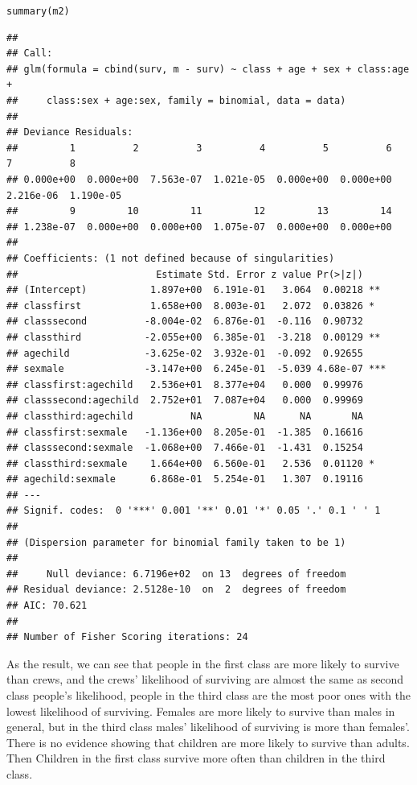 \documentclass[12pt,oneside,a4paper]{article}\usepackage[]{graphicx}\usepackage[]{xcolor}
\makeatletter
\newcommand{\hlstd}[1]{\textcolor[rgb]{0,0,0}{#1}}%
\newcommand{\hlkwd}[1]{\textcolor[rgb]{0,0,0}{#1}}%
\newenvironment{kframe}{%
 \def\at@end@of@kframe{}%
 \ifinner\ifhmode%
  \def\at@end@of@kframe{\end{minipage}}%
  \begin{minipage}{\columnwidth}%
 \fi\fi%
 \def\FrameCommand##1{\hskip\@totalleftmargin \hskip-\fboxsep
 \colorbox{shadecolor}{##1}\hskip-\fboxsep
     \hskip-\linewidth \hskip-\@totalleftmargin \hskip\columnwidth}%
 \MakeFramed {\advance\hsize-\width
   \@totalleftmargin\z@ \linewidth\hsize
   \@setminipage}}%
 {\par\unskip\endMakeFramed%
 \at@end@of@kframe}
\newenvironment{knitrout}{}{} %
\makeatother
\begin{document}
\begin{knitrout}
\color{fgcolor}\begin{kframe}
\begin{alltt}
\hlkwd{summary}\hlstd{(m2)}
\end{alltt}
\begin{verbatim}
## 
## Call:
## glm(formula = cbind(surv, m - surv) ~ class + age + sex + class:age + 
##     class:sex + age:sex, family = binomial, data = data)
## 
## Deviance Residuals: 
##         1          2          3          4          5          6          7          8  
## 0.000e+00  0.000e+00  7.563e-07  1.021e-05  0.000e+00  0.000e+00  2.216e-06  1.190e-05  
##         9         10         11         12         13         14  
## 1.238e-07  0.000e+00  0.000e+00  1.075e-07  0.000e+00  0.000e+00  
## 
## Coefficients: (1 not defined because of singularities)
##                        Estimate Std. Error z value Pr(>|z|)    
## (Intercept)           1.897e+00  6.191e-01   3.064  0.00218 ** 
## classfirst            1.658e+00  8.003e-01   2.072  0.03826 *  
## classsecond          -8.004e-02  6.876e-01  -0.116  0.90732    
## classthird           -2.055e+00  6.385e-01  -3.218  0.00129 ** 
## agechild             -3.625e-02  3.932e-01  -0.092  0.92655    
## sexmale              -3.147e+00  6.245e-01  -5.039 4.68e-07 ***
## classfirst:agechild   2.536e+01  8.377e+04   0.000  0.99976    
## classsecond:agechild  2.752e+01  7.087e+04   0.000  0.99969    
## classthird:agechild          NA         NA      NA       NA    
## classfirst:sexmale   -1.136e+00  8.205e-01  -1.385  0.16616    
## classsecond:sexmale  -1.068e+00  7.466e-01  -1.431  0.15254    
## classthird:sexmale    1.664e+00  6.560e-01   2.536  0.01120 *  
## agechild:sexmale      6.868e-01  5.254e-01   1.307  0.19116    
## ---
## Signif. codes:  0 '***' 0.001 '**' 0.01 '*' 0.05 '.' 0.1 ' ' 1
## 
## (Dispersion parameter for binomial family taken to be 1)
## 
##     Null deviance: 6.7196e+02  on 13  degrees of freedom
## Residual deviance: 2.5128e-10  on  2  degrees of freedom
## AIC: 70.621
## 
## Number of Fisher Scoring iterations: 24
\end{verbatim}
\end{kframe}
\end{knitrout}

As the result, we can see that people in the first class are more likely to survive than crews, and the crews' likelihood of surviving are almost the same as second class people's likelihood, people in the third class are the most poor ones with the lowest likelihood of surviving. Females are more likely to survive than males in general, but in the third class males' likelihood of surviving is more than females'. There is no evidence showing that children are more likely to survive than adults. Then Children in the first class survive more often than children in the third class. 
\end{document}
